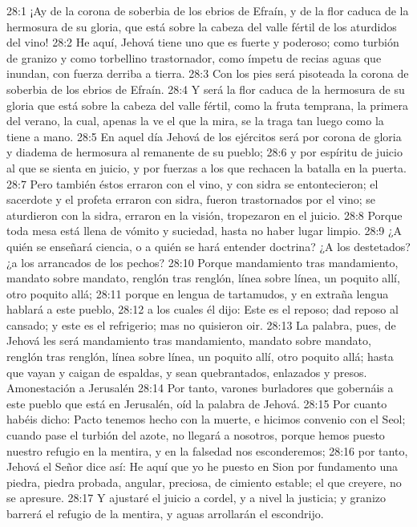 28:1 ¡Ay de la corona de soberbia de los ebrios de Efraín, y de la flor caduca de la hermosura de su gloria, que está sobre la cabeza del valle fértil de los aturdidos del vino! 
28:2 He aquí, Jehová tiene uno que es fuerte y poderoso; como turbión de granizo y como torbellino trastornador, como ímpetu de recias aguas que inundan, con fuerza derriba a tierra. 
28:3 Con los pies será pisoteada la corona de soberbia de los ebrios de Efraín. 
28:4 Y será la flor caduca de la hermosura de su gloria que está sobre la cabeza del valle fértil, como la fruta temprana, la primera del verano, la cual, apenas la ve el que la mira, se la traga tan luego como la tiene a mano. 
28:5 En aquel día Jehová de los ejércitos será por corona de gloria y diadema de hermosura al remanente de su pueblo; 
28:6 y por espíritu de juicio al que se sienta en juicio, y por fuerzas a los que rechacen la batalla en la puerta. 
28:7 Pero también éstos erraron con el vino, y con sidra se entontecieron; el sacerdote y el profeta erraron con sidra, fueron trastornados por el vino; se aturdieron con la sidra, erraron en la visión, tropezaron en el juicio. 
28:8 Porque toda mesa está llena de vómito y suciedad, hasta no haber lugar limpio. 
28:9 ¿A quién se enseñará ciencia, o a quién se hará entender doctrina? ¿A los destetados? ¿a los arrancados de los pechos? 
28:10 Porque mandamiento tras mandamiento, mandato sobre mandato, renglón tras renglón, línea sobre línea, un poquito allí, otro poquito allá; 
28:11 porque en lengua de tartamudos, y en extraña lengua hablará a este pueblo, 
28:12 a los cuales él dijo: Este es el reposo; dad reposo al cansado; y este es el refrigerio; mas no quisieron oir. 
28:13 La palabra, pues, de Jehová les será mandamiento tras mandamiento, mandato sobre mandato, renglón tras renglón, línea sobre línea, un poquito allí, otro poquito allá; hasta que vayan y caigan de espaldas, y sean quebrantados, enlazados y presos. 
Amonestación a Jerusalén 
28:14 Por tanto, varones burladores que gobernáis a este pueblo que está en Jerusalén, oíd la palabra de Jehová. 
28:15 Por cuanto habéis dicho: Pacto tenemos hecho con la muerte, e hicimos convenio con el Seol; cuando pase el turbión del azote, no llegará a nosotros, porque hemos puesto nuestro refugio en la mentira, y en la falsedad nos esconderemos; 
28:16 por tanto, Jehová el Señor dice así: He aquí que yo he puesto en Sion por fundamento una piedra, piedra probada, angular, preciosa, de cimiento estable; el que creyere, no se apresure.  
28:17 Y ajustaré el juicio a cordel, y a nivel la justicia; y granizo barrerá el refugio de la mentira, y aguas arrollarán el escondrijo. 

